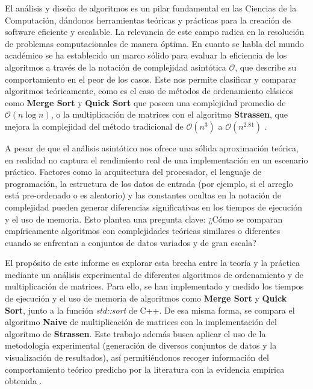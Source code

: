El análisis y diseño de algoritmos es un pilar fundamental en las Ciencias de la Computación, dándonos herramientas teóricas y prácticas para la creación de software eficiente y escalable. La relevancia de este campo radica en la resolución de problemas computacionales de manera óptima. En cuanto se habla del mundo académico se ha establecido un marco sólido para evaluar la eficiencia de los algoritmos a través de la notación de complejidad asintótica $\mathcal{O}$, que describe su comportamiento en el peor de los casos. Este nos permite clasificar y comparar algoritmos teóricamente, como es el caso de métodos de ordenamiento clásicos como \textbf{Merge Sort} y \textbf{Quick Sort} que poseen una complejidad promedio de $\mathcal{O}(n \log n)$, o la multiplicación de matrices con el algoritmo \textbf{Strassen}, que mejora la complejidad del método tradicional de $\mathcal{O}(n^3)$ a $\mathcal{O}(n^{2.81})$ \parencite{cormen2009introduction}.

\medskip

A pesar de que el análisis asintótico nos ofrece una sólida aproximación teórica, en realidad no captura el rendimiento real de una implementación en un escenario práctico. Factores como la arquitectura del procesador, el lenguaje de programación, la estructura de los datos de entrada (por ejemplo, si el arreglo está pre-ordenado o es aleatorio) y las constantes ocultas en la notación de complejidad pueden generar diferencias significativas en los tiempos de ejecución y el uso de memoria. Esto plantea una pregunta clave: ¿Cómo se comparan empíricamente algoritmos con complejidades teóricas similares o diferentes cuando se enfrentan a conjuntos de datos variados y de gran escala?

\medskip

El propósito de este informe es explorar esta brecha entre la teoría y la práctica mediante un análisis experimental de diferentes algoritmos de ordenamiento y de multiplicación de matrices. Para ello, se han implementado y medido los tiempos de ejecución y el uso de memoria de algoritmos como \textbf{Merge Sort} y \textbf{Quick Sort}, junto a la función \textit{std::sort} de C++. De esa misma forma, se compara el algoritmo \textbf{Naive} de multiplicación de matrices con la implementación del algoritmo de \textbf{Strassen}. Este trabajo además busca aplicar el uso de la metodología experimental (generación de diversos conjuntos de datos y la visualización de resultados), así permitiéndonos recoger información del comportamiento teórico predicho por la literatura con la evidencia empírica obtenida \parencite{musser1997introspective}.